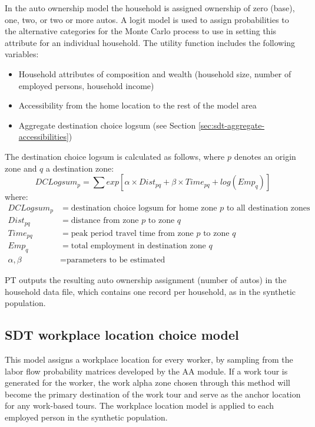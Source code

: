 In the auto ownership model the household is assigned ownership of zero (base), one, two, or two or more autos. A logit model is used to assign probabilities to the alternative categories for the Monte Carlo process to use in setting this attribute for an individual household. The utility function includes the following variables:
\begin{itemize}
\item Household attributes of composition and wealth (household size, number of employed persons, household income)
\item Accessibility from the home location to the rest of the model area
\item Aggregate destination choice logsum (see Section \ref{sec:sdt-aggregate-accessibilities})
\end{itemize}

The destination choice logsum is calculated as follows, where $p$ denotes an origin zone and $q$ a destination zone:
\begin{equation}\label{eq:7.1}
DCLogsum_p = \sum exp \left[ \alpha \times Dist_{pq} + \beta \times Time_{pq} + log(Emp_q) \right]
\end{equation}
where:
\begin{align*}
DCLogsum_p &= \text{destination choice logsum for home zone $p$ to all destination zones} \\
Dist_{pq} &= \text{distance from zone $p$ to zone $q$} \\
Time_{pq} &= \text{peak period travel time from zone $p$ to zone $q$} \\
Emp_q &= \text{total employment in destination zone $q$} \\
\alpha, \beta &= \text{parameters to be estimated}
\end{align*}

\noindent PT outputs the resulting auto ownership assignment (number of autos) in the household data file, which contains one record per household, as in the synthetic population. 

\subsection{SDT workplace location choice model}\label{sec:sdt-workplace-location-choice}
This model assigns a workplace location for every worker, by sampling from the labor flow probability matrices developed by the AA module. If a work tour is generated for the worker, the work alpha zone chosen through this method will become the primary destination of the work tour and serve as the anchor location for any work-based tours. The workplace location model is applied to each employed person in the synthetic population.

